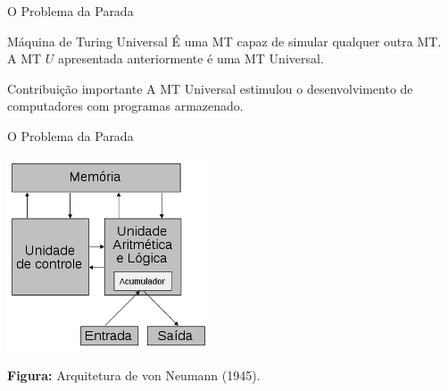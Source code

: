 \documentclass[xcolor=dvipsnames,table]{beamer}
\begin{document}
	\begin{frame}{O Problema da Parada}
		\begin{block}{Máquina de Turing Universal}
			É uma MT capaz de simular qualquer outra MT. \\A MT $U$ apresentada anteriormente é uma MT Universal.
		\end{block}  
		\begin{exampleblock}{Contribuição importante}
			A MT Universal estimulou o desenvolvimento de computadores com programas armazenado.
		\end{exampleblock} 
	\end{frame}
	
	\begin{frame}{O Problema da Parada}
		\begin{center}
			\includegraphics[width=6cm]{images/arqVonNeumann.png}
			
			{\bf Figura:} Arquitetura de von Neumann (1945).
		\end{center}
	\end{frame}
	
\end{document}
